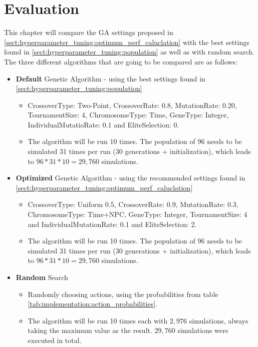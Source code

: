 \chapter{Evaluation}
\label{chap:evaluation}
This chapter will compare the GA settings proposed in \ref{sect:hyperparameter_tuning:optimum_perf_caluclation} with the best settings found in \ref{sect:hyperparameter_tuning:population} as well as with random search. The three different algorithms that are going to be compared are as follows:
\begin{itemize}
	\item \textbf{Default} Genetic Algorithm - using the best settings found in \ref{sect:hyperparameter_tuning:population}
	\begin{itemize}
		\item CrossoverType: Two-Point, CrossoverRate: 0.8, MutationRate: 0.20, TournamentSize: 4, ChromosomeType: Time, GeneType: Integer, IndividualMutatioRate: 0.1 and EliteSelection: 0. 
		\item The algorithm will be run 10 times. The population of 96 needs to be simulated 31 times per run (30 generations + initialization), which leads to $96 * 31 * 10 = 29,760$ simulations.
	\end{itemize}
	\item \textbf{Optimized} Genetic Algorithm - using the recommended settings found in \ref{sect:hyperparameter_tuning:optimum_perf_caluclation}
	\begin{itemize}
		\item CrossoverType: Uniform 0.5, CrossoverRate: 0.9, MutationRate: 0.3, ChromosomeType: Time+NPC, GeneType: Integer, TournamentSize: 4 and IndividualMutationRate: 0.1 and EliteSelection: 2. 
		\item The algorithm will be run 10 times. The population of 96 needs to be simulated 31 times per run (30 generations + initialization), which leads to $96 * 31 * 10 = 29,760$ simulations.
	\end{itemize}
	\item \textbf{Random} Search
	\begin{itemize}
		\item Randomly choosing actions, using the probabilities from table \ref{tab:implementation:action_probabilities}. 
		\item The algorithm will be run 10 times each with $2,976$ simulations, always taking the maximum value as the result. $29,760$ simulations were executed in total.
	\end{itemize}
\end{itemize}


